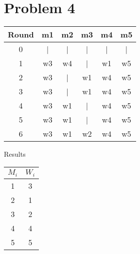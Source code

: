 \documentclass{article}
\newenvironment{problem}[1]{
  \nobreak\section*{Problem #1}
}{}
\begin{document}
  \pagebreak

  \begin{problem}{4}
    \begin{center}
      \begin{tabular}{||c c c c c c||}
        \hline
        Round & m1 & m2 & m3 & m4 & m5 \\
        \hline\hline
        0 & | & | & | & | & | \\
        \hline
        1 & w3 & w4 & | & w1 & w5 \\
        \hline
        2 & w3 & | & w1 & w4 & w5 \\
        \hline
        3 & w3 & | & w1 & w4 & w5 \\
        \hline
        4 & w3 & w1 & | & w4 & w5 \\
        \hline
        5 & w3 & w1 & | & w4 & w5 \\
        \hline
        6 & w3 & w1 & w2 & w4 & w5 \\
        \hline
      \end{tabular}
    \end{center}

    \begin{center}
      Results
    \end{center}

    \begin{center}
      \begin{tabular}{||c c||}
        \hline
        $M_i$ & $W_i$ \\
        \hline\hline
        1 & 3 \\
        \hline
        2 & 1 \\
        \hline
        3 & 2 \\
        \hline
        4 & 4 \\
        \hline
        5 & 5 \\
        \hline
      \end{tabular}
    \end{center}
  \end{problem}
\end{document}
